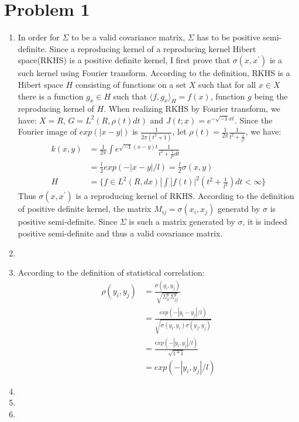\documentclass{article}
\begin{document}
\section{Problem 1}
\begin{enumerate}
\item
    In order for $\Sigma$ to be a valid covariance matrix, $\Sigma$ has to be positive semi-definite. Since a reproducing kernel of a reproducing kernel Hibert space(RKHS) is a positive definite kernel, I first prove that $\sigma(x,x^{'})$ is a such kernel using Fourier transform. According to the definition, RKHS is a Hibert space $H$ consisting of functions on a set $X$ such that for all $x \in X$ there is a function $g_x \in H$ such that $\langle f, g_x\rangle_H = f(x)$, function $g$ being the reproducing kernel of $H$. When realizing RKHS by Fourier transform, we have: $X = R$, $G = L^{2}(R, \rho(t)dt)$ and $J(t;x) = e^{-\sqrt{-1}xt}$. Since the Fourier image of $exp(|x-y|)$ is $\frac{1}{2\pi (t^2+1)}$, let $\rho(t) = \frac{1}{2\pi} \frac{1}{t^2 + \frac{1}{l^2}}$, we have:
    \begin{equation}
    \begin{split}
        k(x,y) &= \frac{1}{2\pi}\int e^{\sqrt{-1}(x-y)t}\frac{1}{t^2 + \frac{1}{l^2}dt}\\
               &= \frac{l}{2}exp(-|x-y|/l) = \frac{l}{2}\sigma(x, y)\\
        H &= \{f\in L^2(R, dx)|\int |f(t)|^2(t^2 + \frac{1}{l^2})dt < \infty\}
    \end{split}
    \end{equation}
Thus $\sigma(x, x^{'})$ is a reproducing kernel of RKHS. According to the definition of positive definite kernel, the matrix $M_{ij} = \sigma(x_i, x_j)$ generatd by $\sigma$ is positive semi-definite. Since $\Sigma$ is such a matrix generated by $\sigma$, it is indeed positive semi-definite and thus a valid covariance matrix.
\item
\item
    According to the definition of statistical correlation:
    \begin{equation}
    \begin{split}
        \rho(y_i, y_j) &= \frac{\sigma(y_i, y_j)}{\sqrt{\Sigma^{y}_{ii}\Sigma^{y}_{jj}}}\\
                       &= \frac{exp(-|y_i - y_j|/l)}{\sqrt{\sigma(y_i, y_i)\sigma(y_j, y_j)}}\\
                       &= \frac{exp(-|y_i, y_j|/l)}{\sqrt{1*1}}\\
        &= exp(-|y_i, y_j|/l)
    \end{split}
    \end{equation}
\item
\item
\item
\end{enumerate}
\end{document}
